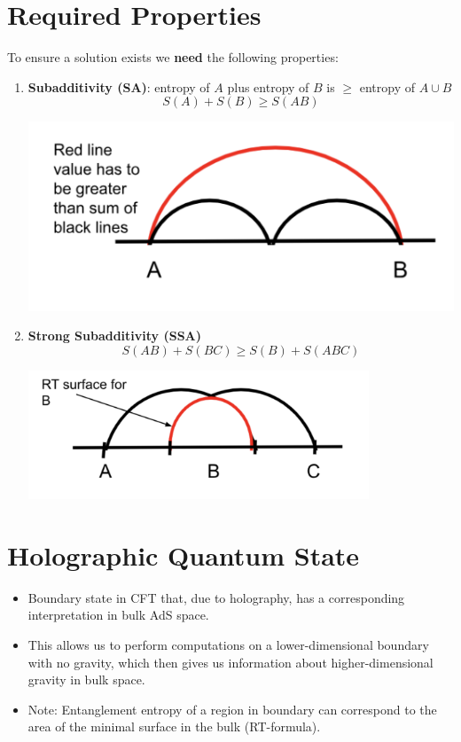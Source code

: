 \documentclass{article}
\begin{document}
\section{Required Properties}
To ensure a solution exists we \textbf{need} the following properties:

\begin{enumerate}
    \item \textbf{Subadditivity (SA)}: entropy of \( A \) plus entropy of \( B \) is \( \geq \) entropy of \( A \cup B \)
    \[
    S(A) + S(B) \geq S(AB)
    \]
    \begin{center}
        \includegraphics[width=\linewidth]{subaddivity.png}
    \end{center}
    
    \item \textbf{Strong Subadditivity (SSA)}
    \[
    S(AB) + S(BC) \geq S(B) + S(ABC)
    \]
    \begin{center}
        \includegraphics[width=0.8\textwidth]{strong_subaddivity.png}
    \end{center}
\end{enumerate}

\section{Holographic Quantum State}
\begin{itemize}
    \item Boundary state in CFT that, due to holography, has a corresponding interpretation in bulk AdS space.
    \item This allows us to perform computations on a lower-dimensional boundary with no gravity, which then gives us information about higher-dimensional gravity in bulk space.
    \item Note: Entanglement entropy of a region in boundary can correspond to the area of the minimal surface in the bulk (RT-formula).
\end{itemize}
\end{document}
